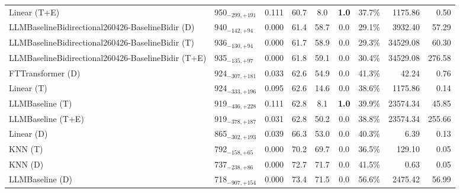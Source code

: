 \begin{tabular}{llcccccrr}
Linear (T+E) & 950${}_{-299,+191}$ & 0.111 & 60.7 & 8.0 & \textcolor{bronze}{\textbf{1.0}} & 37.7\% & 1175.86 & 0.50 \\
LLMBaselineBidirectional260426-BaselineBidir (D) & 940${}_{-142,+94}$ & 0.000 & 61.4 & 58.7 & 0.0 & 29.1\% & 3932.40 & 57.29 \\
LLMBaselineBidirectional260426-BaselineBidir (T) & 936${}_{-130,+94}$ & 0.000 & 61.7 & 58.9 & 0.0 & 29.3\% & 34529.08 & 60.30 \\
LLMBaselineBidirectional260426-BaselineBidir (T+E) & 935${}_{-135,+97}$ & 0.000 & 61.8 & 59.1 & 0.0 & 30.4\% & 34529.08 & 276.58 \\
FTTransformer (D) & 924${}_{-307,+181}$ & 0.033 & 62.6 & 54.9 & 0.0 & 41.3\% & 42.24 & 0.76 \\
Linear (T) & 924${}_{-333,+196}$ & 0.095 & 62.6 & 14.6 & 0.0 & 38.6\% & 1175.86 & 0.14 \\
LLMBaseline (T) & 919${}_{-436,+228}$ & 0.111 & 62.8 & 8.1 & \textcolor{bronze}{\textbf{1.0}} & 39.9\% & 23574.34 & 45.85 \\
LLMBaseline (T+E) & 919${}_{-378,+187}$ & 0.031 & 62.8 & 50.2 & 0.0 & 38.8\% & 23574.34 & 255.66 \\
Linear (D) & 865${}_{-302,+193}$ & 0.039 & 66.3 & 53.0 & 0.0 & 40.3\% & 6.39 & 0.13 \\
KNN (T) & 792${}_{-158,+65}$ & 0.000 & 70.2 & 69.7 & 0.0 & 36.5\% & 129.10 & 0.05 \\
KNN (D) & 737${}_{-238,+86}$ & 0.000 & 72.7 & 71.7 & 0.0 & 41.5\% & 0.63 & 0.05 \\
LLMBaseline (D) & 718${}_{-907,+154}$ & 0.000 & 73.4 & 71.5 & 0.0 & 56.6\% & 2475.42 & 56.99 \\
\bottomrule
\end{tabular}